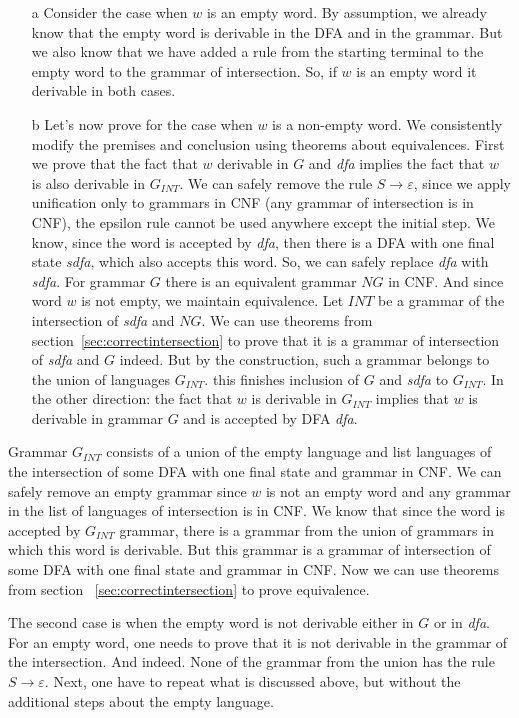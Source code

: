 \begin{enumerate}
\item[a] Consider the case when $w$ is an empty word.
By assumption, we already know that the empty word is derivable in the DFA and in the grammar. But we also know that we have added a rule from the starting terminal to the empty word to the grammar of intersection. So, if $w$ is an empty word it derivable in both cases.
\item[b] Let's now prove for the case when $w$ is a non-empty word.
We consistently modify the premises and conclusion using theorems about equivalences. First we prove that the fact that $w$ derivable in $G$ and \textit{dfa} implies the fact that $w$ is also derivable in $G_{INT}$. We can safely remove the rule $S \to \varepsilon$, since we apply unification only to grammars in CNF (any grammar of intersection is in CNF), the epsilon rule cannot be used anywhere except the initial step.
We know, since the word is accepted by \textit{dfa}, then there is a DFA with one final state \textit{sdfa}, which also accepts this word. So, we can safely replace \textit{dfa} with \textit{sdfa}. 
For grammar $G$ there is an equivalent grammar $NG$ in CNF. And since word $w$ is not empty, we maintain equivalence.
Let $INT$ be a grammar of the intersection of \textit{sdfa} and $NG$. We can use theorems from section~\ref{sec:correctintersection} to prove that it is a grammar of intersection of \textit{sdfa} and $G$ indeed. 
But by the construction, such a grammar belongs to the union of languages $G_{INT}$. this finishes inclusion of $G$ and \textit{sdfa} to $G_{INT}$.
In the other direction: the fact that $w$ is derivable in $G_{INT}$ implies that $w$ is derivable in grammar $G$ and is accepted by DFA \textit{dfa}. 
\end{enumerate}

Grammar $G_{INT}$ consists of a union of the empty language and list languages of the intersection of some DFA with one final state and grammar in CNF. We can safely remove an empty grammar since $w$ is not an empty word and any grammar in the list of languages of intersection is in CNF.
We know that since the word is accepted by $G_{INT}$ grammar, there is a grammar from the union of grammars in which this word is derivable.
But this grammar is a grammar of intersection of some DFA with one final state and grammar in CNF. Now we can use theorems from section ~\ref{sec:correctintersection} to prove equivalence.

The second case is when the empty word is not derivable either in $G$ or in \textit{dfa}.
For an empty word, one needs to prove that it is not derivable in the grammar of the intersection. 
And indeed. None of the grammar from the union has the rule $S \to \varepsilon$. 
Next, one have to repeat what is discussed above, but without the additional steps about the empty language.

